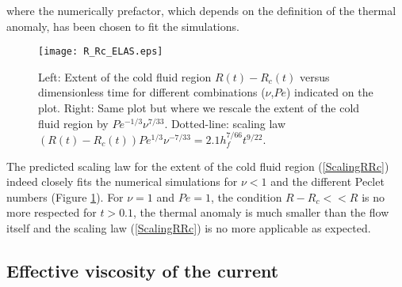 where the  numerically prefactor, which  depends on the  definition of
the thermal anomaly, has been chosen to fit the simulations.
\begin{figure}
  \begin{center}
    \graphicspath{ {/Users/thorey/Documents/These/Projet/Refroidissement/Skin_Model/Figure/JFM_V13/} }
    \texttt{[image: R\_Rc\_ELAS.eps]}
    \caption{Left:  Extent  of  the cold  fluid  region  $R(t)-R_c(t)$
      versus   dimensionless    time   for    different   combinations
      ($\nu$,$Pe$) indicated on the plot.   Right: Same plot but where
      we   rescale  the   extent   of  the   cold   fluid  region   by
      $Pe^{-1/3}\nu^{7/33}$.       Dotted-line:       scaling      law
      $(R(t)-R_c(t))Pe^{1/3}\nu^{-7/33}= 2.1 h_f^{7/66}t^{9/22}$.}
    \label{R_Rc_ELAS}
  \end{center}
\end{figure}

The predicted  scaling law  for the  extent of  the cold  fluid region
(\ref{ScalingRRc}) indeed  closely fits the numerical  simulations for
$\nu<1$ and the different Peclet numbers (Figure \ref{R_Rc_ELAS}). For
$\nu=1$ and $Pe=1$, the condition  $R-R_c<<R$ is no more respected for
$t>0.1$, the thermal anomaly is much  smaller than the flow itself and
the scaling law (\ref{ScalingRRc}) is no more applicable as expected.

\subsection{Effective viscosity of the current}
\label{sec:effect-visc-blist-e}

